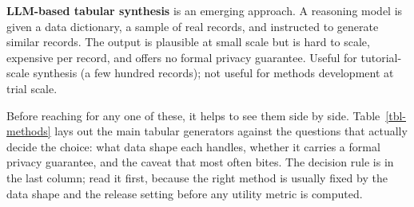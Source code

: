 \documentclass[
  letterpaper,
  11pt]{scrbook}
\begin{document}
\textbf{LLM-based tabular synthesis} is an emerging approach. A
reasoning model is given a data dictionary, a sample of real records,
and instructed to generate similar records. The output is plausible at
small scale but is hard to scale, expensive per record, and offers no
formal privacy guarantee. Useful for tutorial-scale synthesis (a few
hundred records); not useful for methods development at trial scale.

Before reaching for any one of these, it helps to see them side by side.
Table~\ref{tbl-methods} lays out the main tabular generators against the
questions that actually decide the choice: what data shape each handles,
whether it carries a formal privacy guarantee, and the caveat that most
often bites. The decision rule is in the last column; read it first,
because the right method is usually fixed by the data shape and the
release setting before any utility metric is computed.
\end{document}
